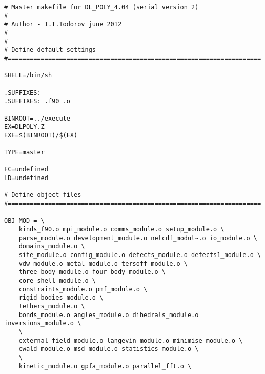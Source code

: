 \begin{verbatim}
# Master makefile for DL_POLY_4.04 (serial version 2)
#
# Author - I.T.Todorov june 2012
#
#
# Define default settings
#=====================================================================

SHELL=/bin/sh

.SUFFIXES:
.SUFFIXES: .f90 .o

BINROOT=../execute
EX=DLPOLY.Z
EXE=$(BINROOT)/$(EX)

TYPE=master

FC=undefined
LD=undefined

# Define object files
#=====================================================================

OBJ_MOD = \
	kinds_f90.o mpi_module.o comms_module.o setup_module.o \
	parse_module.o development_module.o netcdf_modul~.o io_module.o \
	domains_module.o \
	site_module.o config_module.o defects_module.o defects1_module.o \
	vdw_module.o metal_module.o tersoff_module.o \
	three_body_module.o four_body_module.o \
	core_shell_module.o \
	constraints_module.o pmf_module.o \
	rigid_bodies_module.o \
	tethers_module.o \
	bonds_module.o angles_module.o dihedrals_module.o inversions_module.o \
	\
	external_field_module.o langevin_module.o minimise_module.o \
	ewald_module.o msd_module.o statistics_module.o \
	\
	kinetic_module.o gpfa_module.o parallel_fft.o \


\end{verbatim}
